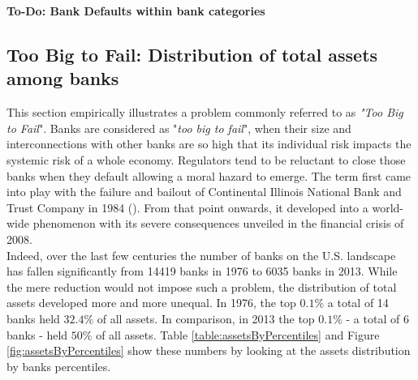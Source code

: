 \documentclass[12pt, a4paper]{article} %
\begin{document}
\textbf{To-Do: Bank Defaults within bank categories}

\fi

\newpage

\subsection{Too Big to Fail: Distribution of total assets among banks}
\label{sec:ToBigToFail}

This section empirically illustrates a problem commonly referred to as \textit{"Too Big to Fail}". 
Banks are considered as "\textit{too big to fail}", when their size and interconnections with other banks are so high that its individual risk impacts the systemic risk of a whole economy. Regulators tend to be reluctant to close those banks when they default allowing a moral hazard to emerge. The term first came into play with the failure and bailout of Continental Illinois National Bank and Trust Company in 1984 (\citet{nurisso20171970s}). From that point onwards, it developed into a world-wide phenomenon with its severe consequences unveiled in the financial crisis of 2008.\\
Indeed, over the last few centuries the number of banks on the U.S. landscape has fallen significantly from 14419 banks in 1976 to 6035 banks in 2013. While the mere reduction would not impose such a problem, the distribution of total assets developed more and more unequal. In 1976, the top $0.1\%$ a total of 14 banks held $32.4\%$ of all assets. In comparison, in 2013 the top $0.1\%$ - a total of 6 banks - held $50\%$ of all assets. Table \ref{table:assetsByPercentiles} and Figure \ref{fig:assetsByPercentiles} show these numbers by looking at the assets distribution by banks percentiles.
\end{document}
